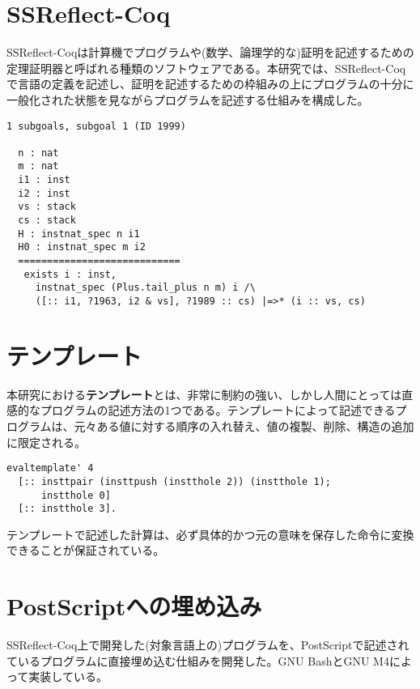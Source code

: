 \documentclass[a4paper, 10.5pt, twocolumn]{ujarticle}
\begin{document}
\section*{SSReflect-Coq}

SSReflect-Coqは計算機でプログラムや(数学、論理学的な)証明を記述するための定理証明器と呼ばれる種類のソフトウェアである。本研究では、SSReflect-Coqで言語の定義を記述し、証明を記述するための枠組みの上にプログラムの十分に一般化された状態を見ながらプログラムを記述する仕組みを構成した。

\begin{lstlisting}[style=plain, label=listing:state_example, caption=自然数上の加算を書いている途中の「状態」の例]
1 subgoals, subgoal 1 (ID 1999)
  
  n : nat
  m : nat
  i1 : inst
  i2 : inst
  vs : stack
  cs : stack
  H : instnat_spec n i1
  H0 : instnat_spec m i2
  ============================
   exists i : inst,
     instnat_spec (Plus.tail_plus n m) i /\
     ([:: i1, ?1963, i2 & vs], ?1989 :: cs) |=>* (i :: vs, cs)
\end{lstlisting}

\newpage

\section*{テンプレート}

本研究における\textbf{テンプレート}とは、非常に制約の強い、しかし人間にとっては直感的なプログラムの記述方法の1つである。テンプレートによって記述できるプログラムは、元々ある値に対する順序の入れ替え、値の複製、削除、構造の追加に限定される。

\begin{lstlisting}[style=plain, label=listing:template_example, caption=テンプレートの記述の例]
evaltemplate' 4
  [:: insttpair (insttpush (instthole 2)) (instthole 1);
      instthole 0]
  [:: instthole 3].
\end{lstlisting}

テンプレートで記述した計算は、必ず具体的かつ元の意味を保存した命令に変換できることが保証されている。

\section*{PostScriptへの埋め込み}

SSReflect-Coq上で開発した(対象言語上の)プログラムを、PostScriptで記述されているプログラムに直接埋め込む仕組みを開発した。GNU BashとGNU M4によって実装している。
\end{document}
